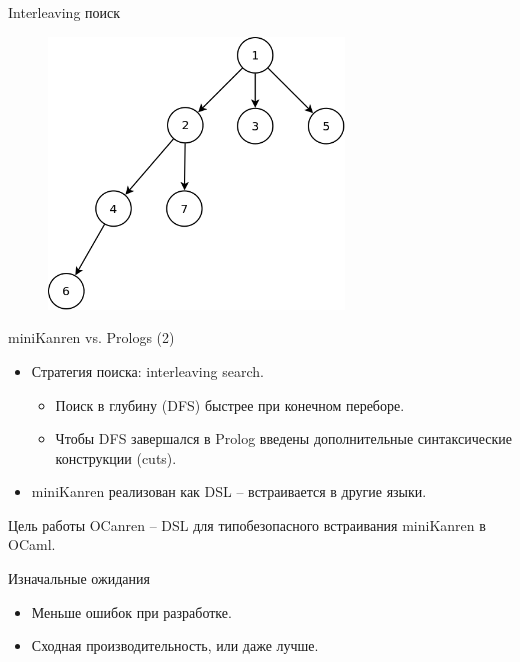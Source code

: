 \documentclass[10pt, mathserif]{beamer}
\theoremstyle{definition}
\begin{document}
\begin{frame}[fragile]{Interleaving поиск}
\begin{figure}
\centering
\includegraphics[width=0.7\textwidth]{interleave.png}
\end{figure}
\end{frame}

\begin{frame}[fragile]{miniKanren vs. Prologs (2)}
\begin{itemize}
  \item Стратегия поиска: interleaving search.
      \begin{itemize}
	\item Поиск в глубину (DFS) быстрее при конечном переборе.
	\item Чтобы DFS завершался в Prolog введены дополнительные синтаксические конструкции (cuts).
      \end{itemize}
  \item miniKanren реализован как DSL -- встраивается в другие языки.
\end{itemize}
\end{frame}

\begin{frame}[fragile]{Цель работы}
OCanren -- DSL для типобезопасного встраивания miniKanren в OCaml.
\end{frame}

\begin{frame}[fragile]{Изначальные ожидания}
\begin{itemize}
 \item Меньше ошибок при разработке.
 \item Сходная производительность, или даже лучше.
\end{itemize}

\end{frame}
\end{document}
